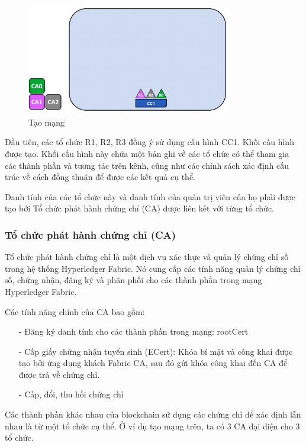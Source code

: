 \begin{figure}[h]
    \centering
    \includegraphics[width=0.8\textwidth]{images/create_network.png}
    \caption{Tạo mạng }
\end{figure}
Đầu tiên, các tổ chức R1, R2, R3 đồng ý sử dụng cấu hình CC1. Khối cấu hình được tạo. 
Khối cấu hình này chứa một bản ghi về các tổ chức có thể tham gia các thành phần và 
tương tác trên kênh, cũng như các chính sách xác định cấu trúc về cách đồng thuận để được các kết quả cụ thể.

Danh tính của các tổ chức này và danh tính của quản trị viên của họ phải 
được tạo bởi Tổ chức phát hành chứng chỉ (CA) được liên kết với từng tổ chức.

\subsubsection*{Tổ chức phát hành chứng chỉ (CA)}

Tổ chức phát hành chứng chỉ là một dịch vụ xác thực và quản lý chứng chỉ số trong hệ thống Hyperledger 
Fabric. Nó cung cấp các tính năng quản lý chứng chỉ số, chứng nhận, đăng ký và phân phối cho các thành 
phần trong mạng Hyperledger Fabric.

Các tính năng chính của CA bao gồm:

\begin{itemize}
    \item[-] Đăng ký danh tính cho các thành phần trong mạng: rootCert
    \item[-] Cấp giấy chứng nhận tuyển sinh (ECert): Khóa bí mật và công khai được tạo bởi ứng dụng khách Fabric CA, sau đó gửi khóa công khai
    đến CA để được trả về chứng chỉ.
    \item[-] Cấp, đổi, thu hồi chứng chỉ
\end{itemize}



Các thành phần khác nhau của blockchain sử dụng các chứng 
chỉ để xác định lẫn nhau là từ một tổ chức cụ thể. Ở ví dụ tạo mạng trên, 
ta có 3 CA đại điện cho 3 tổ chức.


